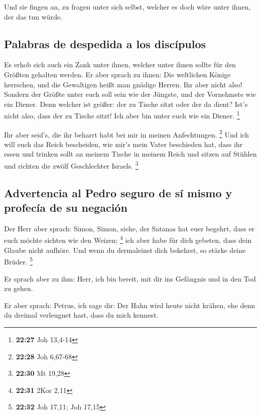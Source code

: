  Und sie fingen an, zu fragen unter sich selbst, welcher
es doch wäre unter ihnen, der das tun würde.

\hypertarget{palabras-de-despedida-a-los-discuxedpulos}{%
\subsection{Palabras de despedida a los
discípulos}\label{palabras-de-despedida-a-los-discuxedpulos}}

 Es erhob sich auch ein Zank unter ihnen, welcher unter
ihnen sollte für den Größten gehalten werden.  Er aber
sprach zu ihnen: Die weltlichen Könige herrschen, und die Gewaltigen
heißt man gnädige Herren.  Ihr aber nicht also! Sondern
der Größte unter euch soll sein wie der Jüngste, und der Vornehmste wie
ein Diener.  Denn welcher ist größer: der zu Tische sitzt
oder der da dient? Ist's nicht also, dass der zu Tische sitzt! Ich aber
bin unter euch wie ein Diener. \footnote{\textbf{22:27} Joh 13,4-14}

 Ihr aber seid's, die ihr beharrt habt bei mir in meinen
Anfechtungen. \footnote{\textbf{22:28} Joh 6,67-68}  Und
ich will euch das Reich bescheiden, wie mir's mein Vater beschieden hat,
 dass ihr essen und trinken sollt an meinem Tische in
meinem Reich und sitzen auf Stühlen und richten die zwölf Geschlechter
Israels. \footnote{\textbf{22:30} Mt 19,28}

\hypertarget{advertencia-al-pedro-seguro-de-suxed-mismo-y-profecuxeda-de-su-negaciuxf3n}{%
\subsection{Advertencia al Pedro seguro de sí mismo y profecía de su
negación}\label{advertencia-al-pedro-seguro-de-suxed-mismo-y-profecuxeda-de-su-negaciuxf3n}}

 Der Herr aber sprach: Simon, Simon, siehe, der Satanas
hat euer begehrt, dass er euch möchte sichten wie den Weizen;
\footnote{\textbf{22:31} 2Kor 2,11}  ich aber habe für
dich gebeten, dass dein Glaube nicht aufhöre. Und wenn du dermaleinst
dich bekehrst, so stärke deine Brüder. \footnote{\textbf{22:32} Joh
  17,11; Joh 17,15}

 Er sprach aber zu ihm: Herr, ich bin bereit, mit dir ins
Gefängnis und in den Tod zu gehen.

 Er aber sprach: Petrus, ich sage dir: Der Hahn wird
heute nicht krähen, ehe denn du dreimal verleugnet hast, dass du mich
kennest.

